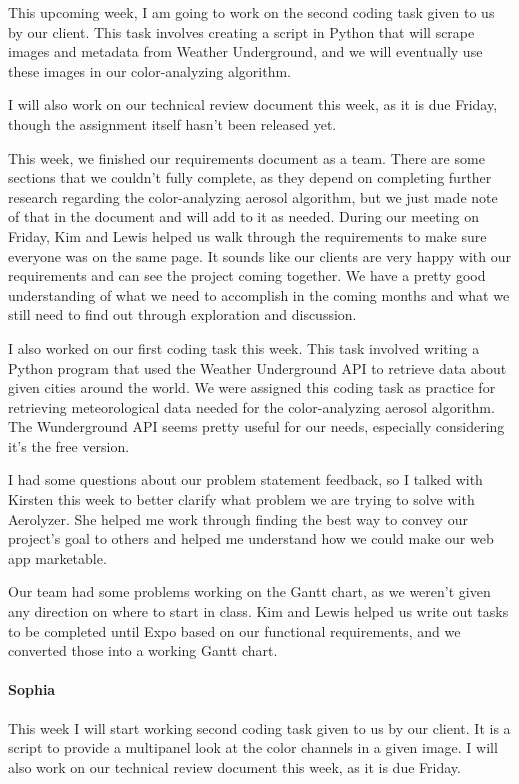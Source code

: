 \documentclass[onecolumn, draftclsnofoot,10pt, compsoc]{IEEEtran}
\begin{document}
\begin{flushleft}
This upcoming week, I am going to work on the second coding task given to us by our client. This task involves creating a script in Python that will scrape images and metadata from Weather Underground, and we will eventually use these images in our color-analyzing algorithm.
 
I will also work on our technical review document this week, as it is due Friday, though the assignment itself hasn't been released yet.
 
 
This week, we finished our requirements document as a team. There are some sections that we couldn't fully complete, as they depend on completing further research regarding the color-analyzing aerosol algorithm, but we just made note of that in the document and will add to it as needed. During our meeting on Friday, Kim and Lewis helped us walk through the requirements to make sure everyone was on the same page. It sounds like our clients are very happy with our requirements and can see the project coming together. We have a pretty good understanding of what we need to accomplish in the coming months and what we still need to find out through exploration and discussion.
 
I also worked on our first coding task this week. This task involved writing a Python program that used the Weather Underground API to retrieve data about given cities around the world. We were assigned this coding task as practice for retrieving meteorological data needed for the color-analyzing aerosol algorithm. The Wunderground API seems pretty useful for our needs, especially considering it's the free version.
 
 
I had some questions about our problem statement feedback, so I talked with Kirsten this week to better clarify what problem we are trying to solve with Aerolyzer. She helped me work through finding the best way to convey our project's goal to others and helped me understand how we could make our web app marketable.
 
Our team had some problems working on the Gantt chart, as we weren't given any direction on where to start in class. Kim and Lewis helped us write out tasks to be completed until Expo based on our functional requirements, and we converted those into a working Gantt chart.
 
\paragraph{Sophia}
 
This week I will start working second coding task given to us by our client. It is a script to provide a multipanel look at the color channels in a given image. I will also work on our technical review document this week, as it is due Friday.
 

\end{flushleft}
\end{document}
